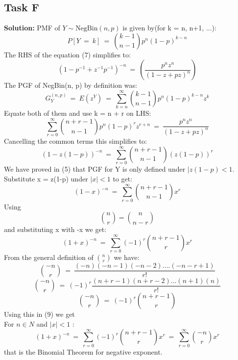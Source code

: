 \documentclass[12pt]{article}
\begin{document}
\subsection{Task F}
\textbf{Solution: } \newline
PMF of $Y \sim \text{NegBin}(n, p)$ is given by(for k = n, n+1, $\dots$):
\begin{equation}
    P[Y\ =\ k]\ =\ \binom{k-1}{n-1}p^n(1-p)^{k-n}
\end{equation}
The RHS of the equation (7) simplifies to:
\[(1-p^{-1}+z^{-1}p^{-1})^{-n}\ =\ \left(\frac{p^{n}z^{n}}{(1-z+pz)^n}\right)\]
The PGF of NegBin(n, p) by definition was:
\[G_Y^{(n,p)}\ =\ E(z^Y)\ =\ \sum_{k=n}^{\infty}\binom{k-1}{n-1}p^n(1-p)^{k-n}z^k\]
Equate both of them and use k = n + r on LHS:
\[\sum_{r=0}^{\infty}\binom{n+r-1}{n-1}p^n(1-p)^{r}z^{r+n}\ =\ \frac{p^{n}z^{n}}{(1-z+pz)^n}\]
Cancelling the common terms this simplifies to:
\[(1-z(1-p))^{-n}\ =\ \sum_{r=0}^{\infty}\binom{n+r-1}{n-1}(z(1-p))^{r}\]
We have proved in (5) that PGF for Y is only defined under $|z(1-p)<1$. \\
Substitute x = z(1-p) under $|x|<1$ to get:
\[(1-x)^{-n}\ =\ \sum_{r=0}^{\infty}\binom{n+r-1}{n-1}x^r \]
Using \[\binom{n}{r} = \binom{n}{n-r}\] and substituting x with -x we get:
\begin{equation}
    (1+x)^{-n}\ =\ \sum_{r=0}^{\infty}(-1)^{r}\binom{n+r-1}{r}x^r
\end{equation}
From the general definition of $\binom{n}{r}$ we have:
\[\binom{-n}{r}\ =\ \frac{(-n)(-n-1)(-n-2)....(-n-r+1)}{r!}\]
\[\binom{-n}{r}\ =\ (-1)^{r}\frac{(n+r-1)(n+r-2)...(n+1)(n)}{r!}\]
\[\binom{-n}{r}\ =\ (-1)^{r}\binom{n+r-1}{r}\]
Using this in (9) we get \\
For $n\in N$ and $|x|<1$ :
\begin{equation}
    (1+x)^{-n}\ =\ \sum_{r=0}^{\infty}(-1)^{r}\binom{n+r-1}{r}x^r\ =\ \sum_{r=0}^{\infty}\binom{-n}{r}x^r
\end{equation}
that is the Binomial Theorem for negative exponent.
\end{document}
